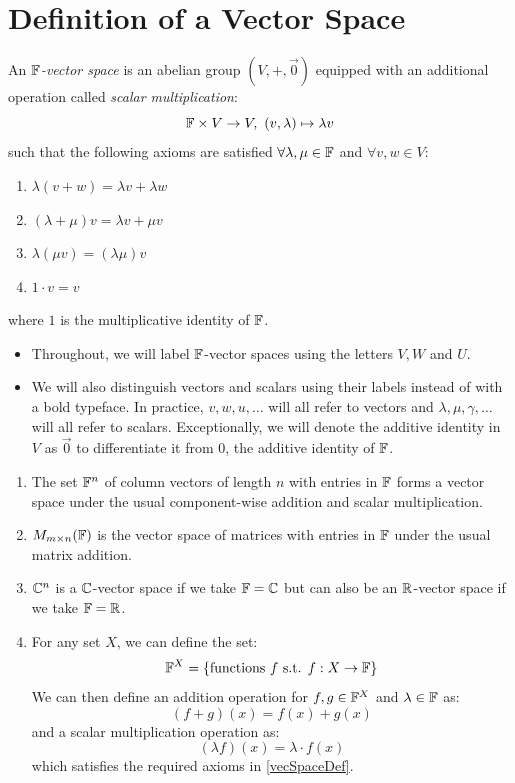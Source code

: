 \documentclass[../main.tex]{subfiles}
\begin{document}
\section{Definition of a Vector Space}
\begin{definition}
  An \textit{$\mathbb{F}$-vector space} is an abelian group $(V, +, \vec{0})$ equipped with an additional operation called \textit{scalar multiplication}: \label{vecSpaceDef}
  \[
    \mathbb{F} \times V \to V,\ (v, \lambda) \mapsto \lambda v
  \]
  such that the following axioms are satisfied $\forall \lambda, \mu \in \mathbb{F}$ and $\forall v, w \in V$:
  \begin{enumerate}
    \item $\lambda(v + w) = \lambda v + \lambda w$
    \item $(\lambda + \mu) v = \lambda v + \mu v$
    \item $\lambda(\mu v) = (\lambda \mu) v$
    \item $1\cdot v = v$
  \end{enumerate}
  where $1$ is the multiplicative identity of $\mathbb{F}$.
\end{definition}
\begin{remark}[Notation]
  \begin{itemize}
    \item Throughout, we will label $\mathbb{F}$-vector spaces using the letters $V, W$ and $U$.
    \item We will also distinguish vectors and scalars using their labels instead of with a bold typeface.
    In practice, $v, w, u, \ldots$ will all refer to vectors and $\lambda, \mu, \gamma, \ldots$ will all refer to scalars.
    Exceptionally, we will denote the additive identity in $V$ as $\vec{0}$ to differentiate it from $0$, the additive identity of $\mathbb{F}$.
  \end{itemize}
\end{remark}
\begin{example} \label{VSExamples}
  \begin{enumerate}
    \item The set $\mathbb{F}^{n}$ of column vectors of length $n$ with entries in $\mathbb{F}$ forms a vector space under the usual component-wise addition and scalar multiplication.
    \item $M_{m \times n}(\mathbb{F})$ is the vector space of matrices with entries in $\mathbb{F}$ under the usual matrix addition.
    \item $\mathbb{C}^{n}$ is a $\mathbb{C}$-vector space if we take $\mathbb{F} = \mathbb{C}$ but can also be an $\mathbb{R}$-vector space if we take $\mathbb{F} = \mathbb{R}$.
    \item For any set $X$, we can define the set:
      \[
        \mathbb{F}^{X} = \{\text{functions $f$ s.t. $f: X \to \mathbb{F}$}\}
      \]
      We can then define an addition operation for $f, g \in \mathbb{F}^{X}$ and $\lambda \in \mathbb{F}$ as:
      \[
        (f + g)(x) = f(x) + g(x)
      \]
      and a scalar multiplication operation as:
      \[
        (\lambda f)(x) = \lambda \cdot f(x)
      \]
      which satisfies the required axioms in \cref{vecSpaceDef}.
  \end{enumerate}
\end{example}
\end{document}
